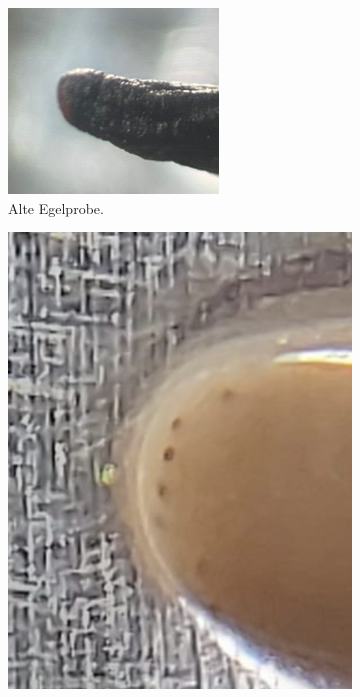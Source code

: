 \documentclass[oneside,10pt,a4paper]{report}
\begin{document}
				\begin{figure}[H]
					\centering
					\begin{subfigure}[b]{0.55\textwidth}
						\includegraphics[width=\textwidth]{trockene_dichotom.jpg}
						\caption{Alte Egelprobe.}
						\label{fig: trockene_augen}
					\end{subfigure}
					\hfill
					\begin{subfigure}[b]{0.37\textwidth}
						\includegraphics[width=\textwidth]{Dichotom_augen}

\end{subfigure}
\end{figure}
\end{document}
